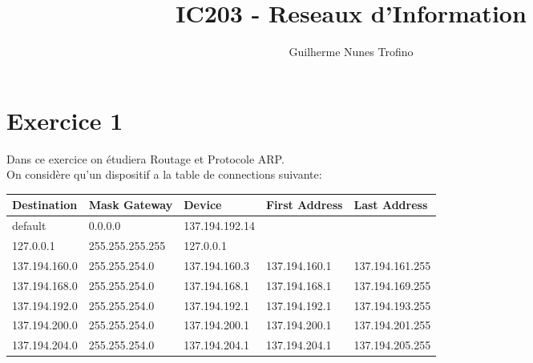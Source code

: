 \documentclass{article}
\title{IC203 - Reseaux d'Information}
\author{Guilherme Nunes Trofino}
\begin{document}
\maketitle
\setlength{\parindent}{0pt}

\newcommand{\adressTable}[7]{
    \begin{table}[H]
        \centering\begin{tabular}{c|ll}
            \multirow{5}{*}{#1} & 193.215.124.#2/#7 & sous-réseau\\
            \cline{2-3}
            & 193.215.124.#3 & \multirow{2}{*}{adresses disponibles}\\
            & 193.215.124.#4 &\\
            \cline{2-3}
            & 193.215.124.#5 & broadcast\\
            \cline{2-3}
            & 255.255.255.#6 & netmask\\
        \end{tabular}
    \end{table}
}



\section*{Exercice 1}
\noindent Dans ce exercice on étudiera Routage et Protocole ARP.\\

On considère qu'un dispositif a la table de connections suivante:
\begin{table}[H]
    \centering\begin{tabular}{lll | ll}
        Destination   & Mask Gateway    & Device        & First Address & Last Address\\
        \hline
        default       & 0.0.0.0         & 137.194.192.14 \\
        127.0.0.1     & 255.255.255.255 & 127.0.0.1      \\
        \hline
        137.194.160.0 & 255.255.254.0   & 137.194.160.3 & 137.194.160.1 & 137.194.161.255\\
        137.194.168.0 & 255.255.254.0   & 137.194.168.1 & 137.194.168.1 & 137.194.169.255\\
        137.194.192.0 & 255.255.254.0   & 137.194.192.1 & 137.194.192.1 & 137.194.193.255\\
        137.194.200.0 & 255.255.254.0   & 137.194.200.1 & 137.194.200.1 & 137.194.201.255\\
        137.194.204.0 & 255.255.254.0   & 137.194.204.1 & 137.194.204.1 & 137.194.205.255\\
        \hline
    \end{tabular}
\end{table}
\end{document}
